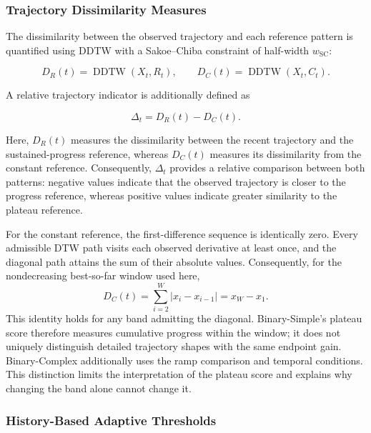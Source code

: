 \documentclass[journal,article,submit,moreauthors]{Definitions/mdpi}
\begin{document}
\subsubsection{Trajectory Dissimilarity Measures}

The dissimilarity between the observed trajectory and each reference pattern
is quantified using DDTW with a Sakoe--Chiba constraint of half-width
$w_{\mathrm{SC}}$:

\begin{equation}
D_R(t)
=
\operatorname{DDTW}(X_t,R_t),
\qquad
D_C(t)
=
\operatorname{DDTW}(X_t,C_t).
\label{eq:ddtw_distances}
\end{equation}

A relative trajectory indicator is additionally defined as

\begin{equation}
\Delta_t = D_R(t)-D_C(t).
\label{eq:trajectory_delta}
\end{equation}

Here, $D_R(t)$ measures the dissimilarity between the recent trajectory and
the sustained-progress reference, whereas $D_C(t)$ measures its
dissimilarity from the constant reference. Consequently, $\Delta_t$
provides a relative comparison between both patterns: negative values
indicate that the observed trajectory is closer to the progress reference,
whereas positive values indicate greater similarity to the plateau
reference.

For the constant reference, the first-difference sequence is identically
zero. Every admissible DTW path visits each observed derivative at least
once, and the diagonal path attains the sum of their absolute values.
Consequently, for the nondecreasing best-so-far window used here,
\begin{equation}
D_C(t)=\sum_{i=2}^{W}|x_i-x_{i-1}|=x_W-x_1.
\label{eq:plateau_score_identity}
\end{equation}
This identity holds for any band admitting the diagonal. Binary-Simple's
plateau score therefore measures cumulative progress within the window;
it does not uniquely distinguish detailed trajectory shapes with the same
endpoint gain. Binary-Complex additionally uses the ramp comparison and
temporal conditions. This distinction limits the interpretation of the
plateau score and explains why changing the band alone cannot change it.


\subsubsection{History-Based Adaptive Thresholds}
\end{document}
